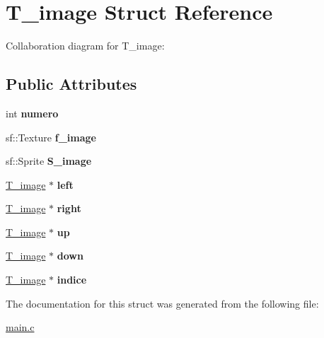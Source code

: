 \hypertarget{structT__image}{}\section{T\+\_\+image Struct Reference}
\label{structT__image}


Collaboration diagram for T\+\_\+image\+:
\subsection*{Public Attributes}
\begin{DoxyCompactItemize}
\item 
int {\bfseries numero}\hypertarget{structT__image_aa6487786d747d7b02b042ee18c5390b6}{}\label{structT__image_aa6487786d747d7b02b042ee18c5390b6}

\item 
sf\+::\+Texture {\bfseries f\+\_\+image}\hypertarget{structT__image_a82b8f0c7d76b399e98922923dc16873a}{}\label{structT__image_a82b8f0c7d76b399e98922923dc16873a}

\item 
sf\+::\+Sprite {\bfseries S\+\_\+image}\hypertarget{structT__image_a93c69963735f495875c95ac0d6e2c686}{}\label{structT__image_a93c69963735f495875c95ac0d6e2c686}

\item 
\hyperlink{structT__image}{T\+\_\+image} $\ast$ {\bfseries left}\hypertarget{structT__image_a8acc2543d72227b9fa2d74c3d08274ec}{}\label{structT__image_a8acc2543d72227b9fa2d74c3d08274ec}

\item 
\hyperlink{structT__image}{T\+\_\+image} $\ast$ {\bfseries right}\hypertarget{structT__image_a0215cbb70ad78502bfbd09e24108c117}{}\label{structT__image_a0215cbb70ad78502bfbd09e24108c117}

\item 
\hyperlink{structT__image}{T\+\_\+image} $\ast$ {\bfseries up}\hypertarget{structT__image_ad85b480de319d5c6e51f1e550cc894cc}{}\label{structT__image_ad85b480de319d5c6e51f1e550cc894cc}

\item 
\hyperlink{structT__image}{T\+\_\+image} $\ast$ {\bfseries down}\hypertarget{structT__image_a8ab5e406210bac945facd96c1ff61b38}{}\label{structT__image_a8ab5e406210bac945facd96c1ff61b38}

\item 
\hyperlink{structT__image}{T\+\_\+image} $\ast$ {\bfseries indice}\hypertarget{structT__image_a01677b0a9bd9530cd45932c783895897}{}\label{structT__image_a01677b0a9bd9530cd45932c783895897}

\end{DoxyCompactItemize}


The documentation for this struct was generated from the following file\+:\begin{DoxyCompactItemize}
\item 
\hyperlink{main_8c}{main.\+c}\end{DoxyCompactItemize}
